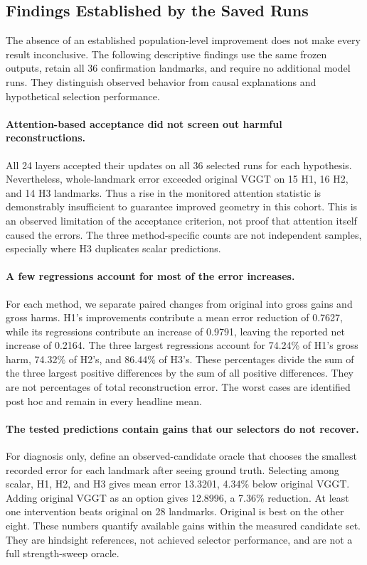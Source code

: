 \subsection{Findings Established by the Saved Runs}
\label{sec:saved-findings}
The absence of an established population-level improvement does not make every result inconclusive. The following descriptive findings use the same frozen outputs, retain all 36 confirmation landmarks, and require no additional model runs. They distinguish observed behavior from causal explanations and hypothetical selection performance.

\paragraph{Attention-based acceptance did not screen out harmful reconstructions.}
All 24 layers accepted their updates on all 36 selected runs for each hypothesis. Nevertheless, whole-landmark error exceeded original VGGT on 15 H1, 16 H2, and 14 H3 landmarks. Thus a rise in the monitored attention statistic is demonstrably insufficient to guarantee improved geometry in this cohort. This is an observed limitation of the acceptance criterion, not proof that attention itself caused the errors. The three method-specific counts are not independent samples, especially where H3 duplicates scalar predictions.

\paragraph{A few regressions account for most of the error increases.}
For each method, we separate paired changes from original into gross gains and gross harms. H1's improvements contribute a mean error reduction of 0.7627, while its regressions contribute an increase of 0.9791, leaving the reported net increase of 0.2164. The three largest regressions account for 74.24\% of H1's gross harm, 74.32\% of H2's, and 86.44\% of H3's. These percentages divide the sum of the three largest positive differences by the sum of all positive differences. They are not percentages of total reconstruction error. The worst cases are identified post hoc and remain in every headline mean.

\paragraph{The tested predictions contain gains that our selectors do not recover.}
For diagnosis only, define an observed-candidate oracle that chooses the smallest recorded error for each landmark after seeing ground truth. Selecting among scalar, H1, H2, and H3 gives mean error 13.3201, 4.34\% below original VGGT. Adding original VGGT as an option gives 12.8996, a 7.36\% reduction. At least one intervention beats original on 28 landmarks. Original is best on the other eight. These numbers quantify available gains within the measured candidate set. They are hindsight references, not achieved selector performance, and are not a full strength-sweep oracle.

